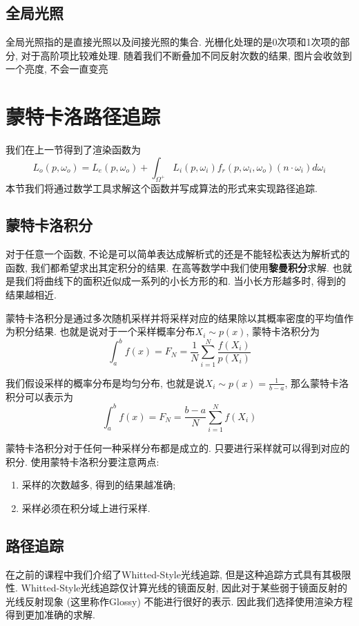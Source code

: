 \documentclass[openany]{progbookcn}
\begin{document}
\section{全局光照}
全局光照指的是直接光照以及间接光照的集合. 光栅化处理的是0次项和1次项的部分, 对于高阶项比较难处理. 随着我们不断叠加不同反射次数的结果, 图片会收敛到一个亮度, 不会一直变亮

\chapter{蒙特卡洛路径追踪}

我们在上一节得到了渲染函数为
\begin{equation}
	L_o(p,\omega_o)=L_e(p,\omega_o)+\int_{\Omega^+}L_i(p,\omega_i)f_r(p,\omega_i,\omega_o)(n\cdot \omega_i)d\omega_i
\end{equation}
本节我们将通过数学工具求解这个函数并写成算法的形式来实现路径追踪. 

\section{蒙特卡洛积分}

对于任意一个函数, 不论是可以简单表达成解析式的还是不能轻松表达为解析式的函数, 我们都希望求出其定积分的结果. 在高等数学中我们使用\textbf{黎曼积分}求解. 也就是我们将曲线下的面积近似成一系列的小长方形的和. 当小长方形越多时, 得到的结果越相近. 

蒙特卡洛积分是通过多次随机采样并将采样对应的结果除以其概率密度的平均值作为积分结果. 也就是说对于一个采样概率分布$X_i\sim p(x)$, 蒙特卡洛积分为
\begin{equation}
	\int_a^b f(x) = F_N=\frac{1}{N}\sum_{i=1}^N\frac{f(X_i)}{p(X_i)}
\end{equation}

我们假设采样的概率分布是均匀分布, 也就是说$X_i\sim p(x)=\frac{1}{b-a}$, 那么蒙特卡洛积分可以表示为
\begin{equation}
	\int_a^b f(x) = F_N=\frac{b-a}{N}\sum_{i=1}^Nf(X_i)
\end{equation}

蒙特卡洛积分对于任何一种采样分布都是成立的. 只要进行采样就可以得到对应的积分. 使用蒙特卡洛积分要注意两点: 
\begin{enumerate}
	\item 采样的次数越多, 得到的结果越准确; 
	\item 采样必须在积分域上进行采样. 
\end{enumerate}

\section{路径追踪}
在之前的课程中我们介绍了Whitted-Style光线追踪, 但是这种追踪方式具有其极限性. Whitted-Style光线追踪仅计算光线的镜面反射, 因此对于某些弱于镜面反射的光线反射现象 (这里称作Glossy) 不能进行很好的表示. 因此我们选择使用渲染方程得到更加准确的求解. 
\end{document}
